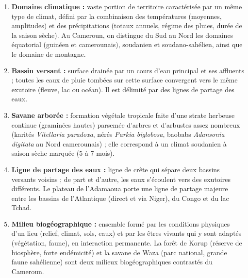 \documentclass[11pt]{article}
\begin{document}
\begin{corrige}
\begin{enumerate}
\item \textbf{Domaine climatique :} vaste portion de territoire caractérisée par un même type de climat, défini par la combinaison des températures (moyennes, amplitudes) et des précipitations (totaux annuels, régime des pluies, durée de la saison sèche). Au Cameroun, on distingue du Sud au Nord les domaines équatorial (guinéen et camerounais), soudanien et soudano-sahélien, ainsi que le domaine de montagne.
\item \textbf{Bassin versant :} surface drainée par un cours d'eau principal et ses affluents ; toutes les eaux de pluie tombées sur cette surface convergent vers le même exutoire (fleuve, lac ou océan). Il est délimité par des lignes de partage des eaux.
\item \textbf{Savane arborée :} formation végétale tropicale faite d'une strate herbeuse continue (graminées hautes) parsemée d'arbres et d'arbustes assez nombreux (karités \emph{Vitellaria paradoxa}, nérés \emph{Parkia biglobosa}, baobabs \emph{Adansonia digitata} au Nord camerounais) ; elle correspond à un climat soudanien à saison sèche marquée (5 à 7 mois).
\item \textbf{Ligne de partage des eaux :} ligne de crête qui sépare deux bassins versants voisins ; de part et d'autre, les eaux s'écoulent vers des exutoires différents. Le plateau de l'Adamaoua porte une ligne de partage majeure entre les bassins de l'Atlantique (direct et via Niger), du Congo et du lac Tchad.
\item \textbf{Milieu biogéographique :} ensemble formé par les conditions physiques d'un lieu (relief, climat, sols, eaux) et par les êtres vivants qui y sont adaptés (végétation, faune), en interaction permanente. La forêt de Korup (réserve de biosphère, forte endémicité) et la savane de Waza (parc national, grande faune sahélienne) sont deux milieux biogéographiques contrastés du Cameroun.
\end{enumerate}
\end{corrige}
\end{document}

